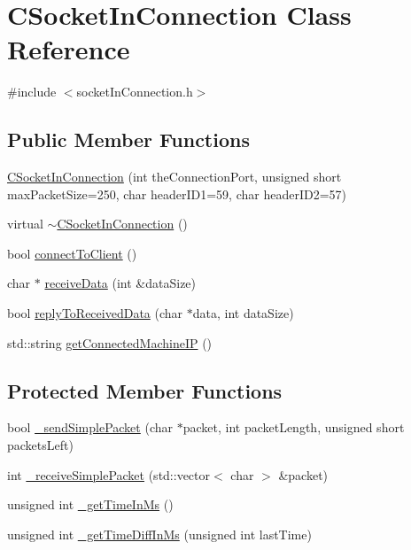 \hypertarget{classCSocketInConnection}{}\section{C\+Socket\+In\+Connection Class Reference}
\label{classCSocketInConnection}


{\ttfamily \#include $<$socket\+In\+Connection.\+h$>$}

\subsection*{Public Member Functions}
\begin{DoxyCompactItemize}
\item 
\hyperlink{classCSocketInConnection_aa1fedace468aaaacc9ed53364fe54dd7}{C\+Socket\+In\+Connection} (int the\+Connection\+Port, unsigned short max\+Packet\+Size=250, char header\+I\+D1=59, char header\+I\+D2=57)
\item 
virtual \hyperlink{classCSocketInConnection_a649b4a046dd268a3d0eeddf9b7513032}{$\sim$\+C\+Socket\+In\+Connection} ()
\item 
bool \hyperlink{classCSocketInConnection_a3573b19ec54411ee9a275ffeb9712cb4}{connect\+To\+Client} ()
\item 
char $\ast$ \hyperlink{classCSocketInConnection_a35d54308230b9cea6f8af95a98441a72}{receive\+Data} (int \&data\+Size)
\item 
bool \hyperlink{classCSocketInConnection_a725ab613c935ef474c9c0ede64533770}{reply\+To\+Received\+Data} (char $\ast$data, int data\+Size)
\item 
std\+::string \hyperlink{classCSocketInConnection_a2d41173714abbf83ffef5663062b453a}{get\+Connected\+Machine\+IP} ()
\end{DoxyCompactItemize}
\subsection*{Protected Member Functions}
\begin{DoxyCompactItemize}
\item 
bool \hyperlink{classCSocketInConnection_a5e8b5ab5a00b3975327d17120c8ddd47}{\+\_\+send\+Simple\+Packet} (char $\ast$packet, int packet\+Length, unsigned short packets\+Left)
\item 
int \hyperlink{classCSocketInConnection_a7f8d909d68c1ecebed43ecdf252a0a97}{\+\_\+receive\+Simple\+Packet} (std\+::vector$<$ char $>$ \&packet)
\item 
unsigned int \hyperlink{classCSocketInConnection_aa2f27fe4555b6e37decf4cedb9ee22f1}{\+\_\+get\+Time\+In\+Ms} ()
\item 
unsigned int \hyperlink{classCSocketInConnection_a39b91ba3a715175ba1ad65f441da0564}{\+\_\+get\+Time\+Diff\+In\+Ms} (unsigned int last\+Time)
\end{DoxyCompactItemize}
